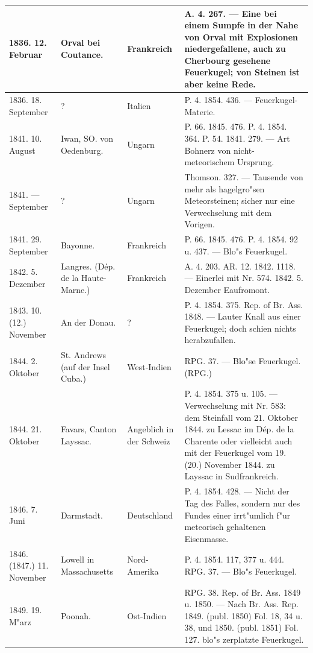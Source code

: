 \documentclass[a4paper, 8pt, oneside, polutonikogreek, german]{article}
\begin{document}
\begin{center}
\begin{longtable}{| p{20mm} | p{25mm} | p{20mm} | p{55mm} |}
        1836. 12. Februar & Orval bei Coutance. & Frankreich & A. 4. 267. --- Eine bei einem Sumpfe in der Nahe von Orval mit Explosionen niedergefallene, auch zu Cherbourg gesehene Feuerkugel; von Steinen ist aber keine Rede. \\ \hline
        1836. 18. September & ? & Italien & P. 4. 1854. 436. --- Feuerkugel-Materie. \\ \hline
        1841. 10. August & Iwan, SO. von Oedenburg. & Ungarn & P. 66. 1845. 476. P. 4. 1854. 364. P. 54. 1841. 279. --- Art Bohnerz von nicht-meteorischem Ursprung. \\ \hline
        1841. --- September & ? & Ungarn & Thomson. 327. --- Tausende von mehr als hagelgro"sen Meteorsteinen; sicher nur eine Verwechselung mit dem Vorigen. \\ \hline
        1841. 29. September & Bayonne. & Frankreich & P. 66. 1845. 476. P. 4. 1854. 92 u. 437. --- Blo"s Feuerkugel. \\ \hline
        1842. 5. Dezember & Langres. (Dép. de la Haute-Marne.) & Frankreich & A. 4. 203. AR. 12. 1842. 1118. --- Einerlei mit Nr. 574. 1842. 5. Dezember Eaufromont. \\ \hline
        1843. 10. (12.) November & An der Donau. & ? & P. 4. 1854. 375. Rep. of Br. Ass. 1848. --- Lauter Knall aus einer Feuerkugel; doch schien nichts herabzufallen. \\ \hline
        1844. 2. Oktober & St. Andrews (auf der Insel Cuba.) & West-Indien & RPG. 37. --- Blo"se Feuerkugel. (RPG.) \\ \hline
        1844. 21. Oktober & Favars, Canton Layssac. & Angeblich in der Schweiz & P. 4. 1854. 375 u. 105. --- Verwechselung mit Nr. 583: dem Steinfall vom 21. Oktober 1844. zu Lessac im Dép. de la Charente oder vielleicht auch mit der Feuerkugel vom 19. (20.) November 1844. zu Layssac in Sudfrankreich. \\ \hline
        1846. 7. Juni & Darmstadt. & Deutschland & P. 4. 1854. 428. --- Nicht der Tag des Falles, sondern nur des Fundes einer irrt"umlich f"ur meteorisch gehaltenen Eisenmasse. \\ \hline
        1846. (1847.) 11. November & Lowell in Massachusetts & Nord-Amerika & P. 4. 1854. 117, 377 u. 444. RPG. 37. --- Blo"s Feuerkugel. \\ \hline
        1849. 19. M"arz & Poonah. & Ost-Indien & RPG. 38. Rep. of Br. Ass. 1849 u. 1850. --- Nach Br. Ass. Rep. 1849. (publ. 1850) Fol. 18, 34 u. 38, und 1850. (publ. 1851) Fol. 127. blo"s zerplatzte Feuerkugel. \\ \hline

\end{longtable}
\end{center}
\end{document}
